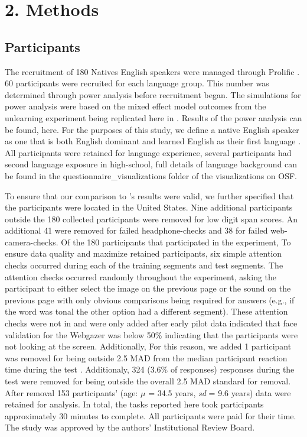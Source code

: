 \section{2. Methods}

\subsection{Participants}
The recruitment of 180 Natives English speakers were managed through Prolific \cite{Palan_2018}. 60 participants were recruited for each language group. This number was determined through power analysis before recruitment began. The simulations for power analysis were based on the mixed effect model outcomes from the unlearning experiment being replicated here in \cite{nixon2020mice}. Results of the power analysis can be found, here.   For the purposes of this study, we define a native English speaker as one that is both English dominant and learned English as their first language \cite{Brown_Tusmagambet_Rahming_Tu_DeSalvo_Wiener_2023}. All participants were retained for language experience, several participants had second language exposure in high-school, full details of language background can be found in the questionnaire\_visualizations folder of the visualizations on OSF.

To ensure that our comparison to \cite{nixon2020mice}'s results were valid, we further specified that the participants were located in the United States. Nine additional participants outside the 180 collected participants were removed for low digit span scores. An additional 41 were removed for failed headphone-checks \cite{milne_2021} and 38 for failed web-camera-checks. Of the 180 participants that participated in the experiment,  To ensure data quality and maximize retained participants, six simple attention checks occurred during each of the training segments and test segments. The attention checks occurred randomly throughout the experiment, asking the participant to either select the image on the previous page or the sound on the previous page with only obvious comparisons being required for answers (e.g., if the word was tonal the other option had a different segment). These attention checks were not in \cite{nixon2020mice} and were only added after early pilot data indicated that face validation for the Webgazer was below 50\% indicating that the participants were not looking at the screen. Additionally, For this reason, we added  1 participant was removed for being outside 2.5 MAD from the median participant reaction time during the test \cite{Leys_2013}. Additionaly, 324 (3.6\% of responses) responses during the test were removed for being outside the overall 2.5 MAD standard for removal. After removal 153 participants' (age: $\mu$ = 34.5 years, \textit{sd} = 9.6 years) data were retained for analysis. In total, the tasks reported here took participants approximately 30 minutes to complete. All participants were paid for their time. The study was approved by the authors' Institutional Review Board.

